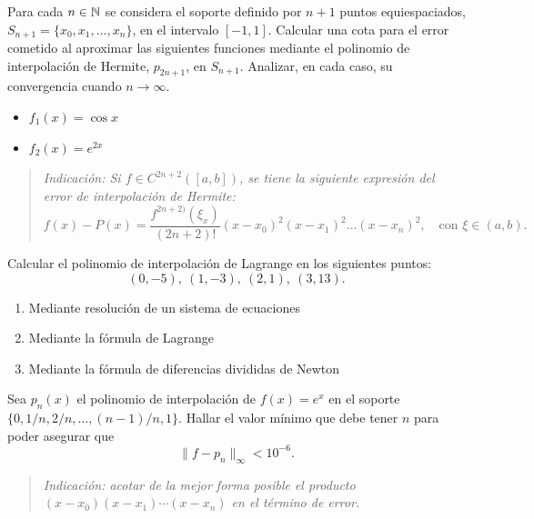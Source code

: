\begin{EjerciciosPropuestos}
\begin{problema}
    Para cada $n\in\operatorname{{\mathbb N}}$ se considera el soporte definido por $n+1$
    puntos equiespaciados, $S_{n+1}=\{x_0,x_1,\dots,x_n\}$, en el intervalo
    $[-1,1]$.  Calcular una cota para el error cometido al aproximar
    las siguientes funciones mediante el polinomio de interpolación
    de Hermite, $p_{2n+1}$, en $S_{n+1}$. Analizar, en cada caso, su
    convergencia cuando $n\to\infty$.
    \begin{itemize}
    \item $\displaystyle f_1(x)=\cos x$
    \item $\displaystyle f_2(x)=e^{2x}$
    \end{itemize}
    \begin{quote}\em\small
      Indicación: Si $f\in C^{2n+2}([a,b])$, se tiene la siguiente
      expresión del error de interpolación de Hermite:
      \begin{equation*}
        f(x)-P(x)=\frac{f^{2n+2)}(\xi_x)}{(2n+2)!}
        (x-x_0)^2(x-x_1)^2\dots(x-x_n)^2, \quad\text{con } \xi\in (a,b).
      \end{equation*}
    \end{quote}
  \end{problema}

  \begin{problema}
    Calcular el polinomio de interpolación de Lagrange en los
    siguientes puntos:
    $$
    (0,-5),\ (1,-3),\ (2,1),\ (3,13).
    $$
    \begin{enumerate}
    \item Mediante resolución de un sistema de ecuaciones
    \item Mediante la fórmula de Lagrange
    \item Mediante la fórmula de diferencias divididas de Newton
    \end{enumerate}

  \end{problema}




  \begin{problema}
    Sea $p_n(x)$ el polinomio de interpolación de $f(x)=e^x$ en el
    soporte $\{0,1/n,2/n,\dots,(n-1)/n,1\}$. Hallar el valor mínimo
    que debe tener $n$ para poder asegurar que
    $$
    \|f-p_n\|_\infty<10^{-6}.
    $$
    \begin{quotation}
      \small\em Indicación: acotar de la mejor forma posible el
      producto $(x-x_0)(x-x_1)\cdots(x-x_n)$ en el término de error.
    \end{quotation}
  \end{problema}


\end{EjerciciosPropuestos}
